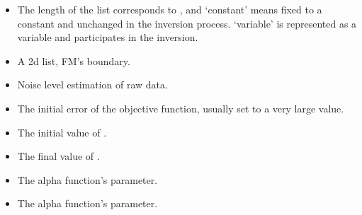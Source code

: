 \documentclass[a4paper,10pt,english,openany]{sphinxmanual}
\begin{document}
\begin{itemize}
\item {} 
The length of the list corresponds to , and ‘constant’ means fixed to a constant and unchanged in the inversion process.
‘variable’ is represented as a variable and participates in the inversion.

\end{itemize}

\begin{itemize}
\item {} 
A 2\sphinxhyphen{}d list, FM’s boundary.

\end{itemize}

\begin{itemize}
\item {} 
Noise level estimation of raw data.

\end{itemize}

\begin{itemize}
\item {} 
The initial error of the objective function, usually set to a very large value.

\end{itemize}

\begin{itemize}
\item {} 
The initial value of .

\end{itemize}

\begin{itemize}
\item {} 
The final value of .

\end{itemize}

\begin{itemize}
\item {} 
The alpha function’s parameter.

\end{itemize}

\begin{itemize}
\item {} 
The alpha function’s parameter.

\end{itemize}
\end{document}
